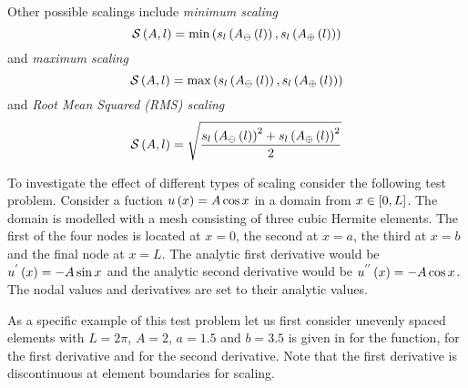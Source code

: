 Other possible scalings include \emph{minimum \arclen scaling}
\begin{equation}
  \nsftwo{A}{l}=\min\pbrac{\fnof{s_{l}}{\fnof{A_{\ominus}}{l}},
    \fnof{s_{l}}{\fnof{A_{\oplus}}{l}}}
  \label{eqn:minimumarclenscale}
\end{equation}
and \emph{maximum \arclen scaling}
\begin{equation}
  \nsftwo{A}{l}=\max\pbrac{\fnof{s_{l}}{\fnof{A_{\ominus}}{l}},
    \fnof{s_{l}}{\fnof{A_{\oplus}}{l}}}
  \label{eqn:maximumarclenscale}
\end{equation}
and \emph{Root Mean Squared (RMS) \arclen scaling}
\begin{equation}
  \nsftwo{A}{l}=\sqrt{\dfrac{\fnof{s_{l}}{\fnof{A_{\ominus}}{l}}^{2}+
    \fnof{s_{l}}{\fnof{A_{\oplus}}{l}}^{2}}{2}}
  \label{eqn:rmsarclenscale}
\end{equation}

To investigate the effect of different types of scaling consider the following
test problem. Consider a fuction $ u\left( x \right) =A\cos x$ in a \oned domain from
$x\in\left[ 0,L \right]$. The domain is modelled with a mesh consisting of three
cubic Hermite elements. The first of the four nodes is located at $x=0$, the
second at $x=a$, the third at $x=b$ and the final node at $x=L$. The analytic
first derivative would be $ u^{'}\left( x \right) =-A\sin x$ and the analytic second
derivative would be $ u^{''}\left( x \right) =-A\cos x$. The nodal values and
derivatives are set to their analytic values.

As a specific example of this test problem let us first consider unevenly
spaced elements with $L=2\pi$, $A=2$, $a=1.5$ and
$b=3.5$ is given in  for the function,
 for the first derivative and
 for the second derivative. Note that the first
derivative is discontinuous at element boundaries for \arclen scaling.


